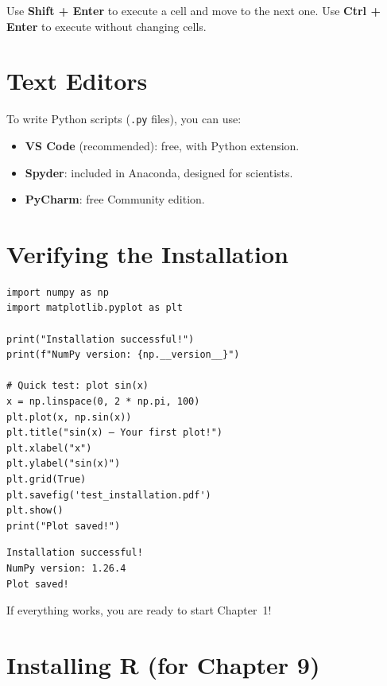 \begin{bestpractice}
Use \textbf{Shift + Enter} to execute a cell and move to the next one. Use \textbf{Ctrl + Enter} to execute without changing cells.
\end{bestpractice}

\section*{Text Editors}

To write Python scripts (\texttt{.py} files), you can use:
\begin{itemize}
\item \textbf{VS Code} (recommended): free, with Python extension.
\item \textbf{Spyder}: included in Anaconda, designed for scientists.
\item \textbf{PyCharm}: free Community edition.
\end{itemize}

\section*{Verifying the Installation}

\begin{codeblock}[title=\textbf{Python --- First test}]
\begin{verbatim}
import numpy as np
import matplotlib.pyplot as plt

print("Installation successful!")
print(f"NumPy version: {np.__version__}")

# Quick test: plot sin(x)
x = np.linspace(0, 2 * np.pi, 100)
plt.plot(x, np.sin(x))
plt.title("sin(x) — Your first plot!")
plt.xlabel("x")
plt.ylabel("sin(x)")
plt.grid(True)
plt.savefig('test_installation.pdf')
plt.show()
print("Plot saved!")
\end{verbatim}
\end{codeblock}

\begin{codeoutput}
\begin{verbatim}
Installation successful!
NumPy version: 1.26.4
Plot saved!
\end{verbatim}
\end{codeoutput}

If everything works, you are ready to start Chapter~1!

\section*{Installing R (for Chapter 9)}


